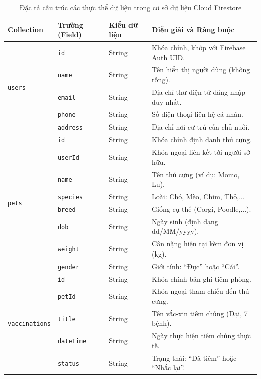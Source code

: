 \begin{table}[H]
    \caption{Đặc tả cấu trúc các thực thể dữ liệu trong cơ sở dữ liệu Cloud Firestore}
    \label{tab:csdl_petcare}
    \centering
    \renewcommand{\arraystretch}{1.15}
    \fontsize{10}{12}\selectfont
    \begin{tabularx}{\textwidth}{|l|l|l|X|}
        \hline
        \textbf{Collection} & \textbf{Trường (Field)} & \textbf{Kiểu dữ liệu} & \textbf{Diễn giải và Ràng buộc} \\ \hline
        \multirow{5}{*}{\texttt{users}} 
        & \texttt{id} & String & Khóa chính, khớp với Firebase Auth UID. \\ \cline{2-4}
        & \texttt{name} & String & Tên hiển thị người dùng (không rỗng). \\ \cline{2-4}
        & \texttt{email} & String & Địa chỉ thư điện tử đăng nhập duy nhất. \\ \cline{2-4}
        & \texttt{phone} & String & Số điện thoại liên hệ cá nhân. \\ \cline{2-4}
        & \texttt{address} & String & Địa chỉ nơi cư trú của chủ nuôi. \\ \hline
        
        \multirow{8}{*}{\texttt{pets}} 
        & \texttt{id} & String & Khóa chính định danh thú cưng. \\ \cline{2-4}
        & \texttt{userId} & String & Khóa ngoại liên kết tới người sở hữu. \\ \cline{2-4}
        & \texttt{name} & String & Tên thú cưng (ví dụ: Momo, Lu). \\ \cline{2-4}
        & \texttt{species} & String & Loài: Chó, Mèo, Chim, Thỏ,... \\ \cline{2-4}
        & \texttt{breed} & String & Giống cụ thể (Corgi, Poodle,...). \\ \cline{2-4}
        & \texttt{dob} & String & Ngày sinh (định dạng dd/MM/yyyy). \\ \cline{2-4}
        & \texttt{weight} & String & Cân nặng hiện tại kèm đơn vị (kg). \\ \cline{2-4}
        & \texttt{gender} & String & Giới tính: ``Đực'' hoặc ``Cái''. \\ \hline

        \multirow{5}{*}{\texttt{vaccinations}}
        & \texttt{id} & String & Khóa chính bản ghi tiêm phòng. \\ \cline{2-4}
        & \texttt{petId} & String & Khóa ngoại tham chiếu đến thú cưng. \\ \cline{2-4}
        & \texttt{title} & String & Tên vắc-xin tiêm chủng (Dại, 7 bệnh). \\ \cline{2-4}
        & \texttt{dateTime} & String & Ngày thực hiện tiêm chủng thực tế. \\ \cline{2-4}
        & \texttt{status} & String & Trạng thái: ``Đã tiêm'' hoặc ``Nhắc lại''. \\ \hline


\end{tabularx}
\end{table}

